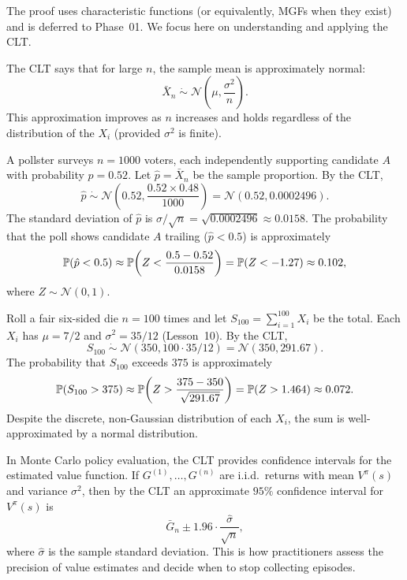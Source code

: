 \documentclass[11pt,a4paper]{article}
\begin{document}
The proof uses characteristic functions (or equivalently, MGFs when
they exist) and is deferred to Phase~01. We focus here on
understanding and applying the CLT.

\begin{remark}
\label{rem:clt_interpretation}
The CLT says that for large $n$, the sample mean is approximately
normal:
\[
    \bar{X}_n \;\dot\sim\; \mathcal{N}\!\left(\mu,
    \frac{\sigma^2}{n}\right).
\]
This approximation improves as $n$ increases and holds regardless of
the distribution of the $X_i$ (provided $\sigma^2$ is finite).
\end{remark}

\begin{example}
\label{ex:clt_polling}
A pollster surveys $n = 1000$ voters, each independently supporting
candidate $A$ with probability $p = 0.52$. Let $\hat{p} = \bar{X}_n$
be the sample proportion. By the CLT,
\[
    \hat{p} \;\dot\sim\; \mathcal{N}\!\left(0.52,
    \frac{0.52 \times 0.48}{1000}\right)
    = \mathcal{N}(0.52, 0.0002496).
\]
The standard deviation of $\hat{p}$ is
$\sigma/\sqrt{n} = \sqrt{0.0002496} \approx 0.0158$.
The probability that the poll shows candidate $A$ trailing
($\hat{p} < 0.5$) is approximately
\[
    \mathbb{P}(\hat{p} < 0.5) \approx \mathbb{P}\!\left(Z < \frac{0.5 - 0.52}{0.0158}\right)
    = \mathbb{P}(Z < -1.27) \approx 0.102,
\]
where $Z \sim \mathcal{N}(0,1)$.
\end{example}

\begin{example}
\label{ex:clt_dice}
Roll a fair six-sided die $n = 100$ times and let
$S_{100} = \sum_{i=1}^{100} X_i$ be the total. Each $X_i$ has
$\mu = 7/2$ and $\sigma^2 = 35/12$ (Lesson~10). By the CLT,
\[
    S_{100} \;\dot\sim\; \mathcal{N}(350, 100 \cdot 35/12)
    = \mathcal{N}(350, 291.67).
\]
The probability that $S_{100}$ exceeds $375$ is approximately
\[
    \mathbb{P}(S_{100} > 375) \approx \mathbb{P}\!\left(Z > \frac{375 - 350}{\sqrt{291.67}}\right)
    = \mathbb{P}(Z > 1.464) \approx 0.072.
\]
Despite the discrete, non-Gaussian distribution of each $X_i$, the
sum is well-approximated by a normal distribution.
\end{example}

\begin{rlconnection}[title={CLT and Confidence Intervals for
    Policy Evaluation}]
In Monte Carlo policy evaluation, the CLT provides confidence
intervals for the estimated value function. If $G^{(1)}, \ldots,
G^{(n)}$ are i.i.d.\ returns with mean $V^\pi(s)$ and variance
$\sigma^2$, then by the CLT an approximate $95\%$ confidence
interval for $V^\pi(s)$ is
\[
    \bar{G}_n \pm 1.96 \cdot \frac{\hat{\sigma}}{\sqrt{n}},
\]
where $\hat{\sigma}$ is the sample standard deviation. This is how
practitioners assess the precision of value estimates and decide
when to stop collecting episodes.
\end{rlconnection}
\end{document}
